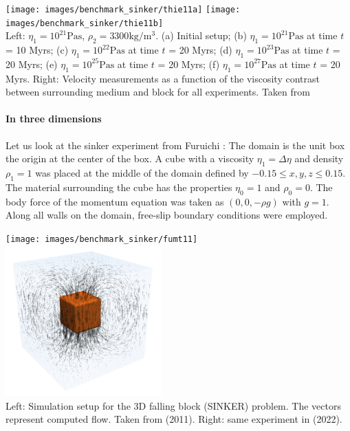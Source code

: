 \begin{center}
\texttt{[image: images/benchmark\_sinker/thie11a]}
\texttt{[image: images/benchmark\_sinker/thie11b]}\\
{\captionfont Left: 
$\eta_1 = 10^{21}\si{\pascal\second}$, $\rho_2= 3300\si{\kg\per\cubic\metre}$. 
(a) Initial setup; 
(b) $\eta_1 = 10^{21}\si{\pascal\second}$ at time $t$ = 10 Myrs; 
(c) $\eta_1 = 10^{22}\si{\pascal\second}$ at time $t$ = 20 Myrs; 
(d) $\eta_1 = 10^{23}\si{\pascal\second}$ at time $t$ = 20 Myrs; 
(e) $\eta_1 = 10^{25}\si{\pascal\second}$ at time $t$ = 20 Myrs; 
(f) $\eta_1 = 10^{27}\si{\pascal\second}$ at time $t$ = 20 Myrs. 
Right: Velocity measurements as a function of the viscosity contrast between
surrounding medium and block for all experiments.
Taken from \cite{thie11}}
\end{center}

\paragraph{In three dimensions}
Let us look at the sinker experiment from Furuichi \etal \cite{fumt11}: 
The domain is the unit box the origin at the center of the box. A cube with a viscosity $\eta_1=\Delta \eta$ 
and density $\rho_1 = 1$ was placed at the middle of the domain defined by
$-0.15 \leq x,y,z \leq 0.15$.
The material surrounding the cube has the properties $\eta_0=1$ and $\rho_0 = 0$. 
The body force of the momentum equation was taken as $(0, 0,-\rho g)$ with $g = 1$.
Along all walls on the domain, free-slip boundary conditions were employed.

\begin{center}
\texttt{[image: images/benchmark\_sinker/fumt11]}
\includegraphics[width=6cm]{images/benchmark_sinker/samm22}\\
{\captionfont Left: Simulation setup for the 3D falling block (SINKER) problem. 
The vectors represent computed flow. Taken from \textcite{fumt11} (2011).
Right: same experiment in \textcite{samm22} (2022). }
\end{center}


